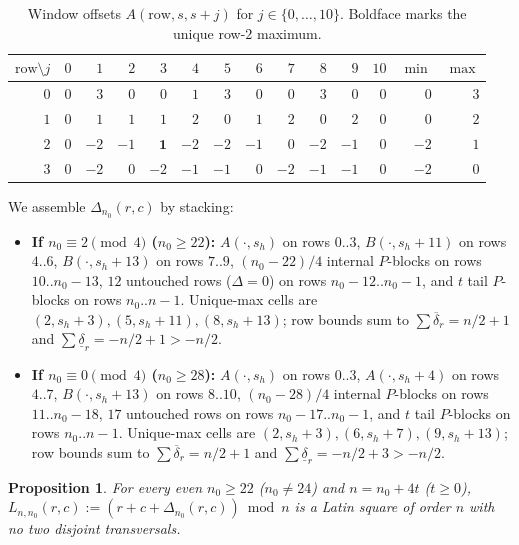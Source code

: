 \documentclass[11pt]{article}
\newtheorem{proposition}[theorem]{Proposition}
\begin{document}
\begin{table}[ht]
\centering
\small
\begin{tabular}{@{}rrrrrrrrrrrrrr@{}}
\toprule
$\mathrm{row} \setminus j$ & $0$ & $1$ & $2$ & $3$ & $4$ & $5$ & $6$ & $7$ & $8$ & $9$ & $10$ & $\min$ & $\max$ \\
\midrule
$0$ & $0$ & $3$ & $0$ & $0$ & $1$ & $3$ & $0$ & $0$ & $3$ & $0$ & $0$ & $0$ & $3$ \\
$1$ & $0$ & $1$ & $1$ & $1$ & $2$ & $0$ & $1$ & $2$ & $0$ & $2$ & $0$ & $0$ & $2$ \\
$2$ & $0$ & $-2$ & $-1$ & $\mathbf{1}$ & $-2$ & $-2$ & $-1$ & $0$ & $-2$ & $-1$ & $0$ & $-2$ & $1$ \\
$3$ & $0$ & $-2$ & $0$ & $-2$ & $-1$ & $-1$ & $0$ & $-2$ & $-1$ & $-1$ & $0$ & $-2$ & $0$ \\
\bottomrule
\end{tabular}
\caption{Window offsets $A(\mathrm{row}, s, s+j)$ for $j \in \{0,\dots,10\}$. Boldface marks the unique row-$2$ maximum.}
\label{tab:gadgetA}
\end{table}

We assemble $\Delta_{n_0}(r, c)$ by stacking:
\begin{itemize}
  \item \textbf{If $n_0 \equiv 2 \pmod 4$ ($n_0 \ge 22$):} $A(\cdot, s_h)$ on rows $0..3$, $B(\cdot, s_h + 11)$ on rows $4..6$, $B(\cdot, s_h + 13)$ on rows $7..9$, $(n_0 - 22)/4$ internal $P$-blocks on rows $10..n_0-13$, $12$ untouched rows ($\Delta = 0$) on rows $n_0-12..n_0-1$, and $t$ tail $P$-blocks on rows $n_0..n-1$. Unique-max cells are $(2, s_h+3), (5, s_h+11), (8, s_h+13)$; row bounds sum to $\sum \overline{\delta}_r = n/2 + 1$ and $\sum \underline{\delta}_r = -n/2 + 1 > -n/2$.
  \item \textbf{If $n_0 \equiv 0 \pmod 4$ ($n_0 \ge 28$):} $A(\cdot, s_h)$ on rows $0..3$, $A(\cdot, s_h + 4)$ on rows $4..7$, $B(\cdot, s_h + 13)$ on rows $8..10$, $(n_0 - 28)/4$ internal $P$-blocks on rows $11..n_0-18$, $17$ untouched rows on rows $n_0-17..n_0-1$, and $t$ tail $P$-blocks on rows $n_0..n-1$. Unique-max cells are $(2, s_h+3), (6, s_h+7), (9, s_h+13)$; row bounds sum to $\sum \overline{\delta}_r = n/2 + 1$ and $\sum \underline{\delta}_r = -n/2 + 3 > -n/2$.
\end{itemize}

\begin{proposition}\label{prop:latin}
For every even $n_0 \ge 22$ ($n_0 \ne 24$) and $n = n_0 + 4t$ ($t \ge 0$), $L_{n, n_0}(r, c) := (r + c + \Delta_{n_0}(r, c)) \bmod n$ is a Latin square of order $n$ with no two disjoint transversals.
\end{proposition}
\end{document}
